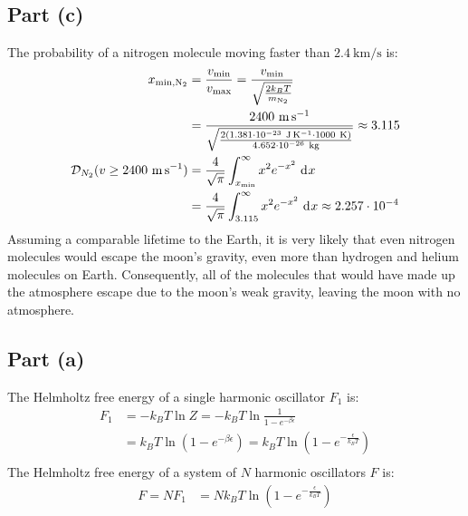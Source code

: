 \documentclass{article}
\begin{document}
\subsection*{Part (c)}
The probability of a nitrogen molecule moving faster than $2.4~\unit{\kilo\meter\per\second}$ is:
\begin{equation}
    \begin{split}
        x_{\text{min},\ce{N2}} & = \frac{v_{\text{min}}}{v_{\text{max}}} = \frac{v_{\text{min}}}{\sqrt{\frac{2k_BT}{m_{\ce{N2}}}}} \\
        & = \frac{2400~\unit{\meter\per\second}}{\sqrt{\frac{2\left(1.381 \cdot 10^{-23}~\unit{\joule\per\kelvin} \cdot 1000~\unit{\kelvin}\right)}{4.652 \cdot 10^{-26}~\unit{\kilo\gram}}}} \approx 3.115 \\
        \mathcal{D}_{N_2}(v \geq 2400~\unit{\meter\per\second}) & = \frac{4}{\sqrt{\pi}}\int_{x_{\text{min}}}^{\infty} x^2 e^{-x^2} \, \diff{x} \\
        & = \frac{4}{\sqrt{\pi}}\int_{3.115}^{\infty} x^2 e^{-x^2} \, \diff{x} \approx 2.257 \cdot 10^{-4} \\
    \end{split}
\end{equation}
Assuming a comparable lifetime to the Earth, it is very likely that even nitrogen molecules would escape the moon's gravity, even more than hydrogen and helium molecules on Earth. Consequently, all of the molecules that would have made up the atmosphere escape due to the moon's weak gravity, leaving the moon with no atmosphere.

\clearpage

\subsection*{Part (a)}
The Helmholtz free energy of a single harmonic oscillator $F_1$ is:
\begin{equation}
    \begin{split}
        F_1 & = -k_BT\ln Z = -k_BT\ln \frac{1}{1 - e^{-\beta\epsilon}} \\
        & = k_BT\ln\left(1 - e^{-\beta\epsilon}\right) = k_BT\ln\left(1 - e^{-\frac{\epsilon}{k_BT}}\right) \\
    \end{split}
\end{equation}
The Helmholtz free energy of a system of $N$ harmonic oscillators $F$ is:
\begin{equation}
    \begin{split}
        F = NF_1 & = Nk_BT\ln\left(1 - e^{-\frac{\epsilon}{k_BT}}\right) \\
    \end{split}
\end{equation}
\end{document}
